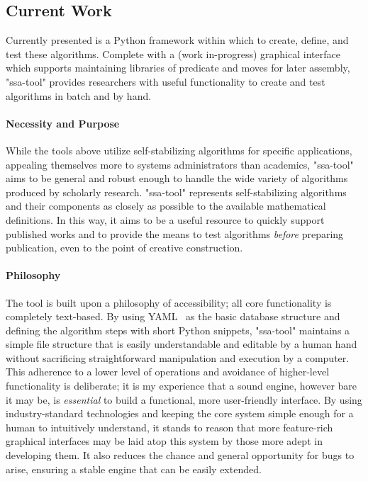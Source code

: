 \subsection{Current Work}
\label{sec:introduction:current-work}
Currently presented is a Python framework within which to
  create, define, and test these algorithms.
Complete with a (work in-progress) graphical interface which supports
  maintaining libraries of predicate and moves for later assembly,
  "ssa-tool" provides researchers with useful functionality
  to create and test algorithms in batch and by hand.


\vspace*{-1.5ex}                  %
\paragraph{Necessity and Purpose}
While the tools above utilize self-stabilizing algorithms for specific applications,
  appealing themselves more to systems administrators than academics,
  "ssa-tool" aims to be general and robust enough to handle
  the wide variety of algorithms produced by scholarly research.
"ssa-tool" represents self-stabilizing algorithms and their components
  as closely as possible to the available mathematical definitions.
In this way, it aims to be a useful resource to quickly support published works
  and to provide the means to test algorithms \emph{before} preparing publication,
  even to the point of creative construction.

\vspace*{-1.5ex}                  %
\paragraph{Philosophy}
The tool is built upon a philosophy of accessibility;
  all core functionality is completely text-based.
By using YAML~\autocite{yaml:ref} as the basic database structure
  and defining the algorithm steps with short Python snippets,
  "ssa-tool" maintains a simple file structure that is easily
  understandable and editable by a human hand
  without sacrificing straightforward
  manipulation and execution by a computer.
This adherence to a lower level of operations and
  avoidance of higher-level functionality is deliberate;
  it is my experience that a sound engine, however bare it may be,
  is \emph{essential} to build a functional, more user-friendly interface.
By using industry-standard technologies and
  keeping the core system simple enough
  for a human to intuitively understand,
  it stands to reason that more feature-rich graphical interfaces
  may be laid atop this system
  by those more adept in developing them.
It also reduces the chance and general opportunity for bugs to arise,
  ensuring a stable engine that can be easily extended.


